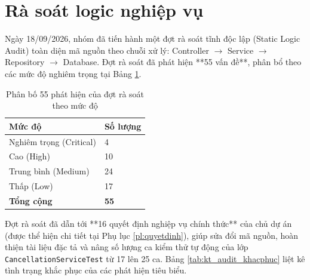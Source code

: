 \section{Rà soát logic nghiệp vụ}
\label{sec:kt_audit}

Ngày 18/09/2026, nhóm đã tiến hành một đợt rà soát tĩnh độc lập (Static Logic Audit) toàn diện mã nguồn theo chuỗi xử lý: Controller $\rightarrow$ Service $\rightarrow$ Repository $\rightarrow$ Database. Đợt rà soát đã phát hiện **55 vấn đề**, phân bổ theo các mức độ nghiêm trọng tại Bảng \ref{tab:kt_audit_mucdo}.

\begin{table}[H]
\centering
\caption{Phân bố 55 phát hiện của đợt rà soát theo mức độ}
\label{tab:kt_audit_mucdo}
\small
\renewcommand{\arraystretch}{1.25}
\begin{tabular}{|p{4.0cm}|p{2.6cm}|}
\hline
\textbf{Mức độ} & \textbf{Số lượng} \\
\hline
Nghiêm trọng (Critical) & 4 \\
\hline
Cao (High) & 10 \\
\hline
Trung bình (Medium) & 24 \\
\hline
Thấp (Low) & 17 \\
\hline
\textbf{Tổng cộng} & \textbf{55} \\
\hline
\end{tabular}
\end{table}

Đợt rà soát đã dẫn tới **16 quyết định nghiệp vụ chính thức** của chủ dự án (được thể hiện chi tiết tại Phụ lục \ref{pl:quyetdinh}), giúp sửa đổi mã nguồn, hoàn thiện tài liệu đặc tả và nâng số lượng ca kiểm thử tự động của lớp \texttt{CancellationServiceTest} từ 17 lên 25 ca. Bảng \ref{tab:kt_audit_khacphuc} liệt kê tình trạng khắc phục của các phát hiện tiêu biểu.

